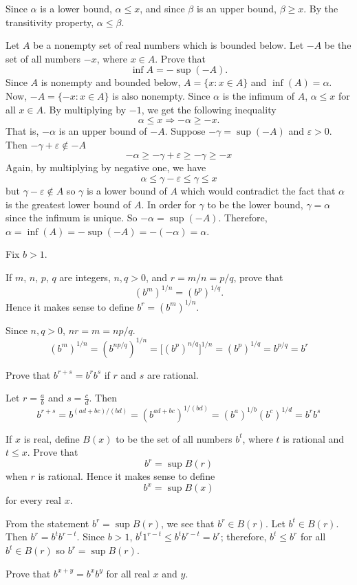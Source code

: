 \begin{exercise}
  Since \(\alpha\) is a lower bound, \(\alpha\leq x\), and since \(\beta\) is
  an upper bound, \(\beta\geq x\).
  By the transitivity property, \(\alpha\leq\beta\).
\item
  Let \(A\) be a nonempty set of real numbers which is bounded below.
  Let \(-A\) be the set of all numbers \(-x\), where \(x\in A\).
  Prove that
  \[
  \inf A = -\sup(-A).
  \]
  Since \(A\) is nonempty and bounded below, \(A = \{x:x\in A\}\) and
  \(\inf(A) = \alpha\).
  Now, \(-A = \{-x:x\in A\}\) is also nonempty.
  Since \(\alpha\) is the infimum of \(A\), \(\alpha\leq x\) for all
  \(x\in A\).
  By multiplying by \(-1\), we get the following inequality
  \[
  \alpha\leq x\Rightarrow -\alpha\geq -x.
  \]
  That is, \(-\alpha\) is an upper bound of \(-A\).
  Suppose \(-\gamma = \sup(-A)\) and \(\varepsilon > 0\).
  Then \(-\gamma + \varepsilon\not\in -A\)
  \[
  -\alpha\geq -\gamma + \varepsilon\geq -\gamma\geq -x
  \]
  Again, by multiplying by negative one, we have
  \[
  \alpha\leq \gamma - \varepsilon\leq\gamma\leq x
  \]
  but \(\gamma - \varepsilon\notin A\) so \(\gamma\) is a lower bound of
  \(A\) which would contradict the fact that \(\alpha\) is the greatest lower
  bound of \(A\). 
  In order for \(\gamma\) to be the lower bound, \(\gamma = \alpha\) since the
  infimum is unique.
  So \(-\alpha = \sup(-A)\).
  Therefore, \(\alpha = \inf(A) = -\sup(-A) = -(-\alpha) = \alpha\).
\item
  Fix \(b > 1\).
  \begin{exercise}[label = (\alph*)]
  \item
    If \(m\), \(n\), \(p\), \(q\) are integers, \(n, q > 0\), and
    \(r = m/n = p/q\), prove that
    \[
    (b^m)^{1/n} = (b^p)^{1/q}.
    \]
    Hence it makes sense to define \(b^r = (b^m)^{1/n}\).
    \par\smallskip
    Since \(n, q > 0\), \(nr = m = np/q\).
    \[
    (b^m)^{1/n} = (b^{np/q})^{1/n} = \bigl[(b^p)^{n/q}\bigr]^{1/n} =
    (b^p)^{1/q} = b^{p/q} = b^r
    \]
  \item
    Prove that \(b^{r + s} = b^rb^s\) if \(r\) and \(s\) are rational.
    \par\smallskip
    Let \(r = \frac{a}{b}\) and \(s = \frac{c}{d}\).
    Then
    \[
    b^{r + s} = b^{(ad + bc)/(bd)} = (b^{ad + bc})^{1/(bd)} =
    (b^a)^{1/b}(b^c)^{1/d} = b^rb^s
    \]
  \item
    If \(x\) is real, define \(B(x)\) to be the set of all numbers \(b^t\),
    where \(t\) is rational and \(t\leq x\).
    Prove that
    \[
    b^r = \sup B(r)
    \]
    when \(r\) is rational.
    Hence it makes sense to define
    \[
    b^x = \sup B(x)
    \]
    for every real \(x\).
    \par\smallskip
    From the statement \(b^r = \sup B(r)\), we see that \(b^r\in B(r)\).
    Let \(b^t\in B(r)\).
    Then \(b^r = b^tb^{r - t}\).
    Since \(b > 1\), \(b^t1^{r - t}\leq b^tb^{r - t} = b^r\); therefore,
    \(b^t\leq b^r\) for all \(b^t\in B(r)\) so \(b^r = \sup B(r)\).
  \item
    Prove that \(b^{x + y} = b^xb^y\) for all real \(x\) and \(y\).
    \par\smallskip
    

\end{exercise}
\end{exercise}
